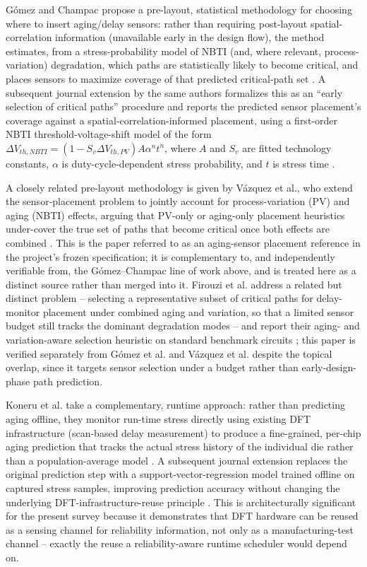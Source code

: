 \documentclass[journal]{IEEEtran}
\begin{document}
G\'omez and Champac propose a pre-layout, statistical methodology for choosing where to insert aging/delay sensors: rather than requiring post-layout spatial-correlation information (unavailable early in the design flow), the method estimates, from a stress-probability model of NBTI (and, where relevant, process-variation) degradation, which paths are statistically likely to become critical, and places sensors to maximize coverage of that predicted critical-path set \cite{r4}. A subsequent journal extension by the same authors formalizes this as an ``early selection of critical paths'' procedure and reports the predicted sensor placement's coverage against a spatial-correlation-informed placement, using a first-order NBTI threshold-voltage-shift model of the form $\Delta V_{th,NBTI}=(1-S_v\Delta V_{th,PV})A\alpha^{n}t^{n}$, where $A$ and $S_v$ are fitted technology constants, $\alpha$ is duty-cycle-dependent stress probability, and $t$ is stress time \cite{r5}.

A closely related pre-layout methodology is given by V\'azquez et al., who extend the sensor-placement problem to jointly account for process-variation (PV) and aging (NBTI) effects, arguing that PV-only or aging-only placement heuristics under-cover the true set of paths that become critical once both effects are combined \cite{r13}. This is the paper referred to as an aging-sensor placement reference in the project's frozen specification; it is complementary to, and independently verifiable from, the G\'omez--Champac line of work above, and is treated here as a distinct source rather than merged into it. Firouzi et al. address a related but distinct problem -- selecting a representative subset of critical paths for delay-monitor placement under combined aging and variation, so that a limited sensor budget still tracks the dominant degradation modes -- and report their aging- and variation-aware selection heuristic on standard benchmark circuits \cite{r14}; this paper is verified separately from G\'omez et al. and V\'azquez et al. despite the topical overlap, since it targets sensor selection under a budget rather than early-design-phase path prediction.

Koneru et al. take a complementary, runtime approach: rather than predicting aging offline, they monitor run-time stress directly using existing DFT infrastructure (scan-based delay measurement) to produce a fine-grained, per-chip aging prediction that tracks the actual stress history of the individual die rather than a population-average model \cite{r6}. A subsequent journal extension replaces the original prediction step with a support-vector-regression model trained offline on captured stress samples, improving prediction accuracy without changing the underlying DFT-infrastructure-reuse principle \cite{r15}. This is architecturally significant for the present survey because it demonstrates that DFT hardware can be reused as a sensing channel for reliability information, not only as a manufacturing-test channel -- exactly the reuse a reliability-aware runtime scheduler would depend on.
\end{document}
